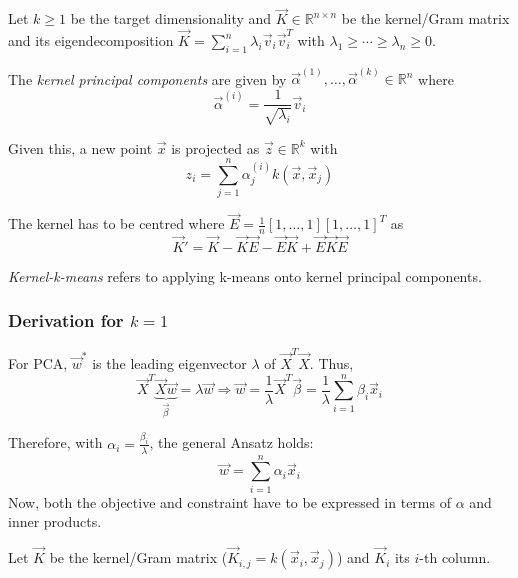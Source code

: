 Let $k \geq 1$ be the target dimensionality
and $\vec{K} \in \mathbb{R}^{n \times n}$
be the kernel/Gram matrix and its eigendecomposition
$\vec{K} = \sum_{i=1}^n{\lambda_i \vec{v}_i \vec{v}_i^T}$
with $\lambda_1 \geq \dotsb \geq \lambda_n \geq 0$.

The \emph{kernel principal components} are given by
$\vec{\alpha}^{(1)}, \dotsc, \vec{\alpha}^{(k)} \in \mathbb{R}^n$
where
\begin{equation*}
    \vec{\alpha}^{(i)} = \frac{1}{\sqrt{\lambda_i}}
    \vec{v}_i
\end{equation*}

Given this, a new point $\vec{x}$ is projected as
$\vec{z} \in \mathbb{R}^k$ with
\begin{equation*}
    z_i = \sum_{j=1}^n{
        \alpha_j^{(i)} k(\vec{x}, \vec{x}_j)
    }
\end{equation*}

The kernel has to be centred where
$\vec{E} = \frac{1}{n} [1, \dotsc, 1] [1, \dotsc, 1]^T$ as
\begin{equation*}
    \vec{K}' = \vec{K} - \vec{K}\vec{E} - \vec{E}\vec{K} + \vec{E}\vec{K}\vec{E}
\end{equation*}

\emph{Kernel-k-means} refers to applying k-means onto
kernel principal components.


\subsubsection{Derivation for $k=1$}
For PCA, $\vec{w}^*$ is the leading eigenvector $\lambda$
of $\vec{X}^T \vec{X}$.
Thus,
\begin{equation*}
    \vec{X}^T \underbrace{\vec{X} \vec{w}}_{\vec{\beta}}
    = \lambda \vec{w}
    \Rightarrow
    \vec{w} = \frac{1}{\lambda} \vec{X}^T \vec{\beta}
        = \frac{1}{\lambda} \sum_{i=1}^{n}{\beta_i \vec{x}_i}
\end{equation*}

Therefore, with $\alpha_i = \frac{\beta_i}{\lambda}$,
the general Ansatz holds:
\begin{equation*}
    \vec{w} = \sum_{i=1}^n{\alpha_i \vec{x}_i}
\end{equation*}
Now, both the objective and constraint have to be expressed in
terms of $\alpha$ and inner products.

Let $\vec{K}$ be the kernel/Gram matrix
($\vec{K}_{i,j} = k(\vec{x}_i, \vec{x}_j)$)
and $\vec{K}_i$ its $i$-th column.

